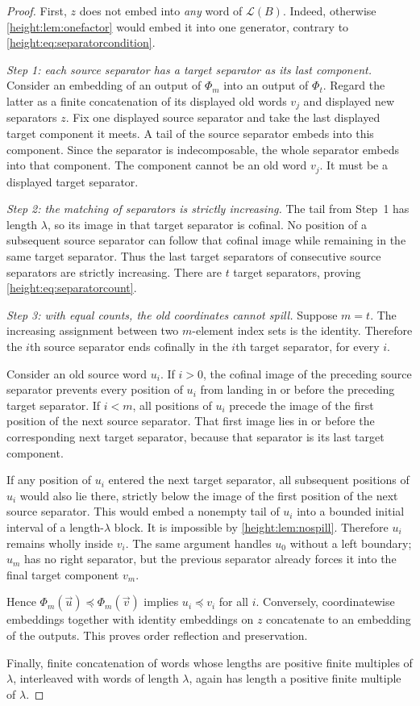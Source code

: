 \documentclass[11pt,a4paper]{article}
\numberwithin{equation}{section}
\theoremstyle{definition}
\theoremstyle{remark}
\newcommand{\emb}{\preccurlyeq}
\newcommand{\Lcal}{\mathcal L}
\begin{document}
\begin{proof}
First, $z$ does not embed into \emph{any} word of $\Lcal(B)$.
Indeed, otherwise \cref{height:lem:onefactor} would embed it into one generator,
contrary to \eqref{height:eq:separatorcondition}.

\emph{Step 1: each source separator has a target separator as its last
component.} Consider an embedding of an output of $\Phi_m$ into an output
of $\Phi_t$. Regard the latter as a finite concatenation of its displayed
old words $v_j$ and displayed new separators $z$. Fix one displayed
source separator and take the last displayed target component it meets.
A tail of the source separator embeds into this component. Since the
separator is indecomposable, the whole separator embeds into that component.
The component cannot be an old word $v_j$. It must be a displayed target
separator.

\emph{Step 2: the matching of separators is strictly increasing.}
The tail from Step~1 has length $\lambda$, so its image in that target
separator is cofinal. No position of a subsequent source separator can
follow that cofinal image while remaining in the same target separator.
Thus the last target separators of consecutive source separators are
strictly increasing. There are $t$ target separators, proving
\eqref{height:eq:separatorcount}.

\emph{Step 3: with equal counts, the old coordinates cannot spill.}
Suppose $m=t$. The increasing assignment between two $m$-element index
sets is the identity. Therefore the $i$th source separator ends cofinally
in the $i$th target separator, for every $i$.

Consider an old source word $u_i$. If $i>0$, the cofinal image of the
preceding source separator prevents every position of $u_i$ from landing
in or before the preceding target separator. If $i<m$, all positions
of $u_i$ precede the image of the first position of the next source
separator. That first image lies in or before the corresponding next
target separator, because that separator is its last target component.

If any position of $u_i$ entered the next target separator, all subsequent
positions of $u_i$ would also lie there, strictly below the image of the
first position of the next source separator. This would embed a nonempty
tail of $u_i$ into a bounded initial interval of a length-$\lambda$ block.
It is impossible by \cref{height:lem:nospill}. Therefore $u_i$ remains wholly
inside $v_i$. The same argument handles $u_0$ without a left boundary;
$u_m$ has no right separator, but the previous separator already forces
it into the final target component $v_m$.

Hence $\Phi_m(\vec u)\emb\Phi_m(\vec v)$ implies
$u_i\emb v_i$ for all $i$. Conversely, coordinatewise embeddings together
with identity embeddings on $z$ concatenate to an embedding of the
outputs. This proves order reflection and preservation.

Finally, finite concatenation of words whose lengths are positive finite
multiples of $\lambda$, interleaved with words of length $\lambda$, again
has length a positive finite multiple of $\lambda$.
\end{proof}
\end{document}
